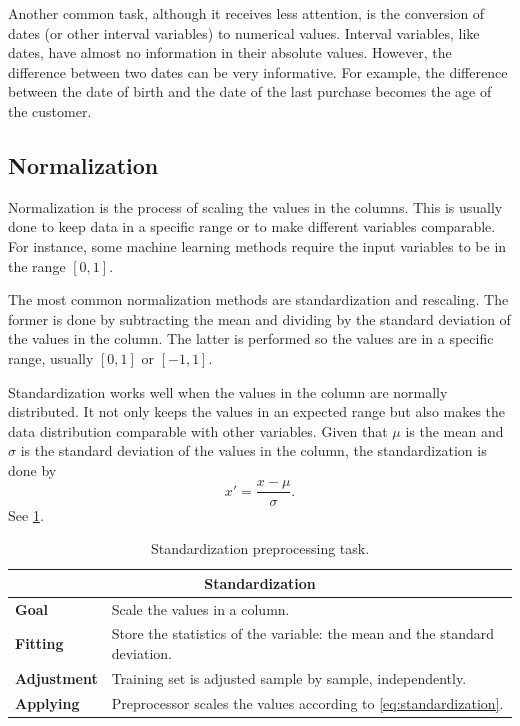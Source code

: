 Another common task, although it receives less attention, is the conversion of dates (or
other interval variables) to numerical values.  Interval variables, like dates, have
almost no information in their absolute values.  However, the difference between two
dates can be very informative.  For example, the difference between the date of birth and
the date of the last purchase becomes the age of the customer.

\subsection{Normalization}

Normalization is the process of scaling the values in the columns.  This is usually done to
keep data in a specific range or to make different variables comparable.  For instance,
some machine
learning methods require the input variables to be in the range $[0, 1]$.

The most common normalization methods are standardization and rescaling.  The former is done
by subtracting the mean and dividing by the standard deviation of the values in the column.
The latter is performed so the values are in a specific range, usually $[0, 1]$ or $[-1, 1]$.

Standardization works well when the values in the column are normally distributed.
It not only keeps the values in an expected range but also makes the data distribution
comparable with other variables.  Given that $\mu$ is the mean and $\sigma$ is the
standard deviation of the values in the column, the standardization is done by
\begin{equation}
  \label{eq:standardization}
  x' = \frac{x - \mu}{\sigma}\text{.}
\end{equation}
See \cref{tab:standardization}.

\begin{table}\caption{Standardization preprocessing task.}
  \centering
  \begin{tabular}{lp{6cm}}
    \toprule
    \multicolumn{2}{c}{\textbf{Standardization}} \\
    \midrule
    \textbf{Goal} &
      Scale the values in a column. \\
    \textbf{Fitting} &
      Store the statistics of the variable: the mean and the standard deviation. \\
    \textbf{Adjustment} &
      Training set is adjusted sample by sample, independently. \\
    \textbf{Applying} &
      Preprocessor scales the values according to \cref{eq:standardization}. \\
    \bottomrule
  \end{tabular}
  \label{tab:standardization}
\end{table}


